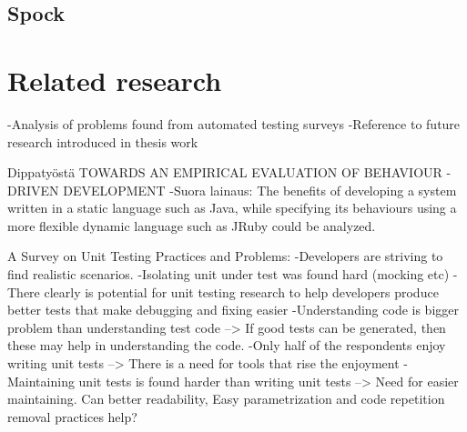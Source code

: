     \subsection{Spock}
\section{Related research} %
    -Analysis of problems found from automated testing surveys\newline
    -Reference to future research introduced in thesis work\newline

    Dippatyöstä TOWARDS AN EMPIRICAL EVALUATION
                OF BEHAVIOUR - DRIVEN DEVELOPMENT\newline
    -Suora lainaus: The benefits of developing a system written in a static language such as Java, while specifying its
     behaviours using a more flexible dynamic language such as JRuby could be analyzed.\newline\newline

    A Survey on Unit Testing Practices and Problems:\newline
    -Developers are striving to find realistic scenarios.\newline
    -Isolating unit under test was found hard (mocking etc)\newline
    -There clearly is potential for unit testing research to help developers produce better tests that make debugging and fixing easier\newline
    -Understanding code is bigger problem than understanding test code\newline
    --> If good tests can be generated, then these may help in understanding the code.\newline
    -Only half of the respondents enjoy writing unit tests\newline
    --> There is a need for tools that rise the enjoyment\newline
    -Maintaining unit tests is found harder than writing unit tests\newline
    --> Need for easier maintaining. Can better readability, Easy parametrization and code repetition removal practices help?\newline\newline

